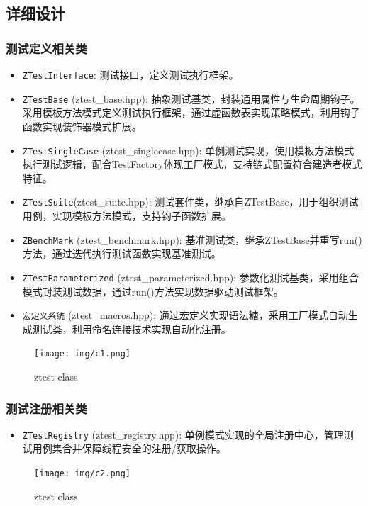\documentclass{article}
\begin{document}
\subsection{详细设计}
\subsubsection{测试定义相关类}
\begin{itemize}
    \item \texttt{ZTestInterface}:  测试接口，定义测试执行框架。
    \item \texttt{ZTestBase} (ztest\_base.hpp): 抽象测试基类，封装通用属性与生命周期钩子。采用模板方法模式定义测试执行框架，通过虚函数表实现策略模式，利用钩子函数实现装饰器模式扩展。
    \item \texttt{ZTestSingleCase} (ztest\_singlecase.hpp): 单例测试实现，使用模板方法模式执行测试逻辑，配合TestFactory体现工厂模式，支持链式配置符合建造者模式特征。
    \item \texttt{ZTestSuite}(ztest\_suite.hpp): 测试套件类，继承自ZTestBase，用于组织测试用例，实现模板方法模式，支持钩子函数扩展。
    \item \texttt{ZBenchMark} (ztest\_benchmark.hpp): 基准测试类，继承ZTestBase并重写run()方法，通过迭代执行测试函数实现基准测试。
    \item \texttt{ZTestParameterized} (ztest\_parameterized.hpp): 参数化测试基类，采用组合模式封装测试数据，通过run()方法实现数据驱动测试框架。
    \item \texttt{宏定义系统} (ztest\_macros.hpp): 通过宏定义实现语法糖，采用工厂模式自动生成测试类，利用命名连接技术实现自动化注册。
\end{itemize}
\begin{figure}[H]
    \centering
    \texttt{[image: img/c1.png]} %
    \caption{ ztest class}
    \label{fig:ztest class }
\end{figure}

\subsubsection{测试注册相关类}
\begin{itemize}
    \item \texttt{ZTestRegistry} (ztest\_registry.hpp): 单例模式实现的全局注册中心，管理测试用例集合并保障线程安全的注册/获取操作。
\end{itemize}
\begin{figure}[H]
    \centering
    \texttt{[image: img/c2.png]} %
    \caption{ ztest class}
    \label{fig:ztest class }
\end{figure}
\end{document}
